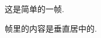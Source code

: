 \documentclass[nofonts]{beamer}
\begin{document}
\begin{frame}
	这是简单的一帧.

	帧里的内容是垂直居中的.
\end{frame}
\end{document}
